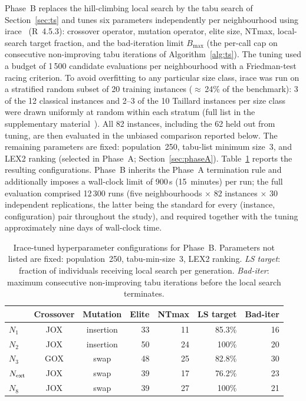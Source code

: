 \documentclass[preprint,12pt]{elsarticle}
\begin{document}
Phase~B replaces the hill-climbing local search by the tabu search of Section~\ref{sec:ts} and tunes six parameters independently per neighbourhood using irace~\cite{Lopez2016} (R~4.5.3): crossover operator, mutation operator, elite size, NTmax, local-search target fraction, and the bad-iteration limit $B_{\max}$ (the per-call cap on consecutive non-improving tabu iterations of Algorithm~\ref{alg:ts}). The tuning used a budget of 1\,500 candidate evaluations per neighbourhood with a Friedman-test racing criterion. To avoid overfitting to any particular size class, irace was run on a stratified random subset of 20 training instances ($\approx$\,24\% of the benchmark): 3 of the 12 classical instances and 2--3 of the 10 Taillard instances per size class were drawn uniformly at random within each stratum (full list in the supplementary material~\cite{DiazSupp2026}). All 82 instances, including the 62 held out from tuning, are then evaluated in the unbiased comparison reported below. The remaining parameters are fixed: population~250, tabu-list minimum size~3, and LEX2 ranking (selected in Phase~A; Section~\ref{sec:phaseA}). Table~\ref{tab:tuned} reports the resulting configurations. Phase~B inherits the Phase~A termination rule and additionally imposes a wall-clock limit of 900\,s (15~minutes) per run; the full evaluation comprised 12\,300 runs (five neighbourhoods $\times$ 82 instances $\times$ 30 independent replications, the latter being the standard for every (instance, configuration) pair throughout the study), and required together with the tuning approximately nine days of wall-clock time.

\begin{table}[htbp]
\centering
\caption{Irace-tuned hyperparameter configurations for Phase~B. Parameters not listed are fixed: population~250, tabu-min-size~3, LEX2 ranking. \emph{LS target}: fraction of individuals receiving local search per generation. \emph{Bad-iter}: maximum consecutive non-improving tabu iterations before the local search terminates.}
\label{tab:tuned}
\begin{tabular}{l c c r r r r}
\hline
 & Crossover & Mutation & Elite & NTmax & LS target & Bad-iter \\
\hline
$N_1$         & JOX & insertion & 33 & 11 & 85.3\% & 16 \\
$N_2$         & JOX & insertion & 50 & 24 & 100\%  & 20 \\
$N_3$         & GOX & swap      & 48 & 25 & 82.8\% & 30 \\
$N_{\rm ext}$ & JOX & swap      & 39 & 17 & 76.2\% & 23 \\
$N_8$         & JOX & swap      & 39 & 27 & 100\%  & 21 \\
\hline
\end{tabular}
\end{table}
\end{document}
